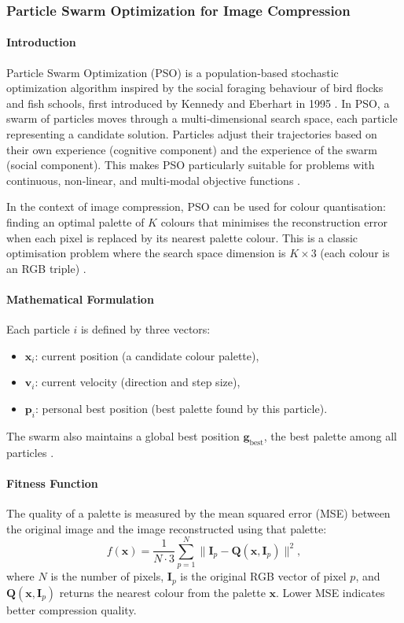 \subsubsection{Particle Swarm Optimization for Image Compression}

\paragraph{Introduction}
Particle Swarm Optimization (PSO) is a population‑based stochastic optimization algorithm inspired by the social foraging behaviour of bird flocks and fish schools, first introduced by Kennedy and Eberhart in 1995 \cite{mohsen2012}. In PSO, a swarm of particles moves through a multi‑dimensional search space, each particle representing a candidate solution. Particles adjust their trajectories based on their own experience (cognitive component) and the experience of the swarm (social component). This makes PSO particularly suitable for problems with continuous, non‑linear, and multi‑modal objective functions \cite{Khaleel2014}.

In the context of image compression, PSO can be used for colour quantisation: finding an optimal palette of $K$ colours that minimises the reconstruction error when each pixel is replaced by its nearest palette colour. This is a classic optimisation problem where the search space dimension is $K \times 3$ (each colour is an RGB triple) \cite{Khaleel2014}.

\paragraph{Mathematical Formulation}
Each particle $i$ is defined by three vectors:
\begin{itemize}
    \item $\mathbf{x}_i$: current position (a candidate colour palette),
    \item $\mathbf{v}_i$: current velocity (direction and step size),
    \item $\mathbf{p}_i$: personal best position (best palette found by this particle).
\end{itemize}
The swarm also maintains a global best position $\mathbf{g}_{\text{best}}$, the best palette among all particles \cite{mohsen2012}.

\paragraph{Fitness Function}
The quality of a palette is measured by the mean squared error (MSE) between the original image and the image reconstructed using that palette\cite{mohsen2012}:
\[
f(\mathbf{x}) = \frac{1}{N \cdot 3} \sum_{p=1}^{N} \| \mathbf{I}_p - \mathbf{Q}(\mathbf{x}, \mathbf{I}_p) \|^2, 
\]
where $N$ is the number of pixels, $\mathbf{I}_p$ is the original RGB vector of pixel $p$, and $\mathbf{Q}(\mathbf{x}, \mathbf{I}_p)$ returns the nearest colour from the palette $\mathbf{x}$. Lower MSE indicates better compression quality.


